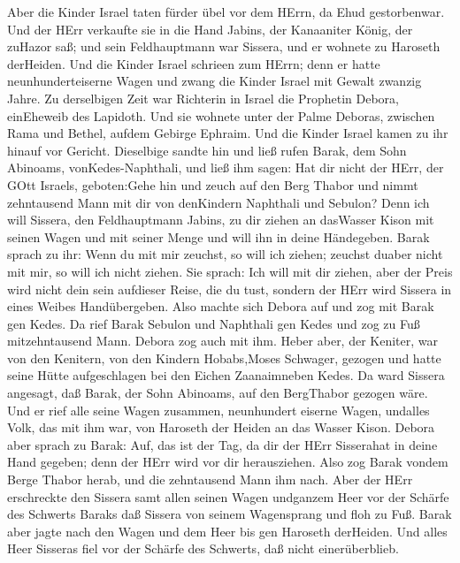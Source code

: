  Aber die Kinder Israel taten fürder übel vor dem HErrn, da
Ehud gestorbenwar.  Und der HErr verkaufte sie in die Hand
Jabins, der Kanaaniter König, der zuHazor saß; und sein Feldhauptmann
war Sissera, und er wohnete zu Haroseth derHeiden.  Und die
Kinder Israel schrieen zum HErrn; denn er hatte neunhunderteiserne Wagen
und zwang die Kinder Israel mit Gewalt zwanzig Jahre.  Zu
derselbigen Zeit war Richterin in Israel die Prophetin Debora,
einEheweib des Lapidoth.  Und sie wohnete unter der Palme
Deboras, zwischen Rama und Bethel, aufdem Gebirge Ephraim. Und die
Kinder Israel kamen zu ihr hinauf vor Gericht.  Dieselbige
sandte hin und ließ rufen Barak, dem Sohn Abinoams, vonKedes-Naphthali,
und ließ ihm sagen: Hat dir nicht der HErr, der GOtt Israels,
geboten:Gehe hin und zeuch auf den Berg Thabor und nimmt zehntausend
Mann mit dir von denKindern Naphthali und Sebulon?  Denn ich
will Sissera, den Feldhauptmann Jabins, zu dir ziehen an dasWasser Kison
mit seinen Wagen und mit seiner Menge und will ihn in deine Händegeben.
 Barak sprach zu ihr: Wenn du mit mir zeuchst, so will ich
ziehen; zeuchst duaber nicht mit mir, so will ich nicht ziehen.
 Sie sprach: Ich will mit dir ziehen, aber der Preis wird
nicht dein sein aufdieser Reise, die du tust, sondern der HErr wird
Sissera in eines Weibes Handübergeben. Also machte sich Debora auf und
zog mit Barak gen Kedes.  Da rief Barak Sebulon und
Naphthali gen Kedes und zog zu Fuß mitzehntausend Mann. Debora zog auch
mit ihm.  Heber aber, der Keniter, war von den Kenitern,
von den Kindern Hobabs,Moses Schwager, gezogen und hatte seine Hütte
aufgeschlagen bei den Eichen Zaanaimneben Kedes.  Da ward
Sissera angesagt, daß Barak, der Sohn Abinoams, auf den BergThabor
gezogen wäre.  Und er rief alle seine Wagen zusammen,
neunhundert eiserne Wagen, undalles Volk, das mit ihm war, von Haroseth
der Heiden an das Wasser Kison.  Debora aber sprach zu
Barak: Auf, das ist der Tag, da dir der HErr Sisserahat in deine Hand
gegeben; denn der HErr wird vor dir herausziehen. Also zog Barak vondem
Berge Thabor herab, und die zehntausend Mann ihm nach. 
Aber der HErr erschreckte den Sissera samt allen seinen Wagen undganzem
Heer vor der Schärfe des Schwerts Baraks daß Sissera von seinem
Wagensprang und floh zu Fuß.  Barak aber jagte nach den
Wagen und dem Heer bis gen Haroseth derHeiden. Und alles Heer Sisseras
fiel vor der Schärfe des Schwerts, daß nicht einerüberblieb.
